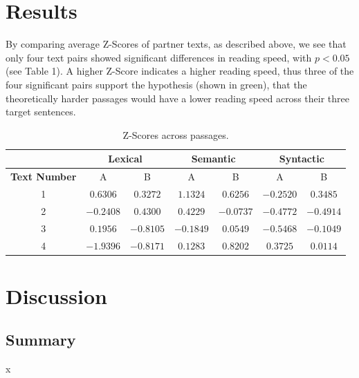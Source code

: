 \documentclass[11pt,letterpaper]{article}
\begin{document}
	
	\section{Results}
	
	By comparing average Z-Scores of partner texts, as described above, we see that only four text pairs showed significant differences in reading speed, with $p < 0.05$  (see Table 1). A higher Z-Score indicates a higher reading speed, thus three of the four significant pairs support the hypothesis (shown in green), that the theoretically harder passages would have a lower reading speed across their three target sentences.
	
	\begin{table}[!htbp]
		\tiny
		\begin{center}
			\begin{tabular}{*7c}
				\toprule
				 & \multicolumn{2}{c}{\textbf{Lexical}} & \multicolumn{2}{c}{\textbf{Semantic}} & \multicolumn{2}{c}{\textbf{Syntactic}} \\
				\midrule
				\textbf{Text Number} & A & B & A & B & A & B \\
				1 & $ 0.6306 $ & $ 0.3272 $ & $ 1.1324 $ & $ 0.6256 $ & \cellcolor{green!25} $ -0.2520 $ & \cellcolor{green!25} $ 0.3485 $ \\
				2 & \cellcolor{green!25} $ -0.2408 $ & \cellcolor{green!25} $ 0.4300 $ & $ 0.4229 $ & $ -0.0737 $ & $ -0.4772 $ & $ -0.4914 $ \\
				3 & \cellcolor{red!25} $ 0.1956 $ & \cellcolor{red!25} $ -0.8105 $ & $ -0.1849 $ & $ 0.0549 $ & $ -0.5468 $ & $ -0.1049 $ \\
				4 & \cellcolor{green!25} $ -1.9396 $ & \cellcolor{green!25} $ -0.8171 $ & $ 0.1283 $ & $ 0.8202 $ & $ 0.3725 $ & $ 0.0114 $ \\
				\bottomrule
			\end{tabular}
		\end{center}
		\caption{Z-Scores across passages.}
	\end{table}
	
	\section{Discussion}
	
	\subsection{Summary}
	
	x
	
\end{document}
